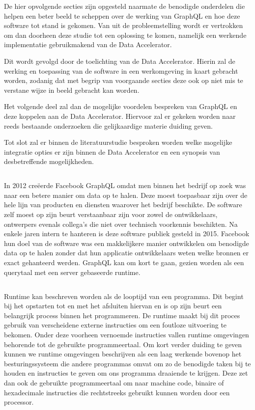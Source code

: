 De hier opvolgende secties zijn opgesteld naarmate de benodigde onderdelen die helpen een beter beeld te scheppen over de werking van GraphQL en hoe deze software tot stand is gekomen. Van uit de probleemstelling wordt er vertrokken om dan doorheen deze studie tot een oplossing te komen, namelijk een werkende implementatie gebruikmakend van de Data Accelerator.

Dit wordt gevolgd door de toelichting van de Data Accelerator. Hierin zal de werking en toepassing van de software in een werkomgeving in kaart gebracht worden, zodanig dat met begrip van voorgaande secties deze ook op niet mis te verstane wijze in beeld gebracht kan worden.

Het volgende deel zal dan de mogelijke voordelen bespreken van GraphQL en deze koppelen aan de Data Accelerator. Hiervoor zal er gekeken worden naar reeds bestaande onderzoeken die gelijkaardige materie duiding geven.

Tot slot zal er binnen de literatuurstudie besproken worden welke mogelijke integratie opties er zijn binnen de Data Accelerator en een synopsis van desbetreffende mogelijkheden.

\subsection{}%
\label{sec:Gegevens ophalen}
In 2012 creëerde Facebook GraphQL omdat men binnen het bedrijf op zoek was naar een betere manier om data op te halen. Deze moest toepasbaar zijn over de hele lijn van producten en diensten waarover het bedrijf beschikte. De software zelf moest op zijn beurt verstaanbaar zijn voor zowel de ontwikkelaars, ontwerpers evenals collega’s die niet over technisch voorkennis beschikten. Na enkele jaren intern te hanteren is deze software publiek gesteld in 2015. Facebook hun doel van de software was een makkelijkere manier ontwikkelen om benodigde data op te halen zonder dat hun applicatie ontwikkelaars weten welke bronnen er exact gehanteerd werden. GraphQL kan om kort te gaan, gezien worden als een querytaal met een server gebaseerde runtime.

\subsection{}%
\label{sec:Runtime}
Runtime kan beschreven worden als de looptijd van een programma. Dit begint bij het opstarten tot en met het afsluiten hiervan en is op zijn beurt een belangrijk process binnen het programmeren. De runtime maakt bij dit proces gebruik van verscheidene externe instructies om een foutloze uitvoering te bekomen. Onder deze voorheen vernoemde instructies vallen runtime omgevingen behorende tot de gebruikte programmeertaal. Om kort verder duiding te geven kunnen we runtime omgevingen beschrijven als een laag werkende bovenop het besturingssysteem die andere programmas omvat om zo de benodigde taken bij te houden en instructies te geven om ons programma draaiende te krijgen. Deze zet dan ook de gebruikte programmeertaal om naar machine code, binaire of hexadecimale instructies die rechtstreeks gebruikt kunnen worden door een processor.

